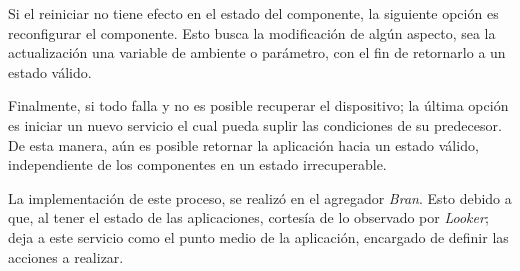 Si el reiniciar no tiene efecto en el estado del componente, la siguiente opción es reconfigurar el componente. Esto busca la modificación de algún aspecto, sea la actualización una variable de ambiente o parámetro, con el fin de retornarlo a un estado válido. 
 
Finalmente, si todo falla y no es posible recuperar el dispositivo; la última opción es iniciar un nuevo servicio el cual pueda suplir las condiciones de su predecesor. De esta manera, aún es posible retornar la aplicación hacia un estado válido, independiente de los componentes en un estado irrecuperable.

La implementación de este proceso, se realizó en el agregador \textit{Bran}. Esto debido a que, al tener el estado de las aplicaciones, cortesía de lo observado por \textit{Looker}; deja a este servicio como el punto medio de la aplicación, encargado de definir las acciones a realizar.